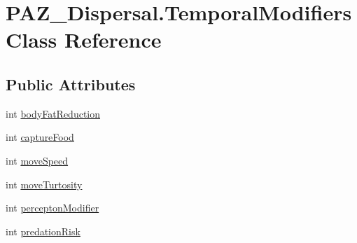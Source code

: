 \hypertarget{class_p_a_z___dispersal_1_1_temporal_modifiers}{\section{P\-A\-Z\-\_\-\-Dispersal.\-Temporal\-Modifiers Class Reference}
\label{class_p_a_z___dispersal_1_1_temporal_modifiers}
}
\subsection*{Public Attributes}
\begin{DoxyCompactItemize}
\item 
int \hyperlink{class_p_a_z___dispersal_1_1_temporal_modifiers_af08412d5db4d708e7f83dd8cb5d67ace}{body\-Fat\-Reduction}
\item 
int \hyperlink{class_p_a_z___dispersal_1_1_temporal_modifiers_a93dd691c99a68c867f1a489d9004c17a}{capture\-Food}
\item 
int \hyperlink{class_p_a_z___dispersal_1_1_temporal_modifiers_a29689e883883cb3d41d7627e4bd88683}{move\-Speed}
\item 
int \hyperlink{class_p_a_z___dispersal_1_1_temporal_modifiers_a0c1f46c6720e49485435188b18122395}{move\-Turtosity}
\item 
int \hyperlink{class_p_a_z___dispersal_1_1_temporal_modifiers_a0395bc1bfa1a3803f5ef6a7ec3ac6d94}{percepton\-Modifier}
\item 
int \hyperlink{class_p_a_z___dispersal_1_1_temporal_modifiers_a291c6b8b495422e9b980ed9833a78da4}{predation\-Risk}
\end{DoxyCompactItemize}


